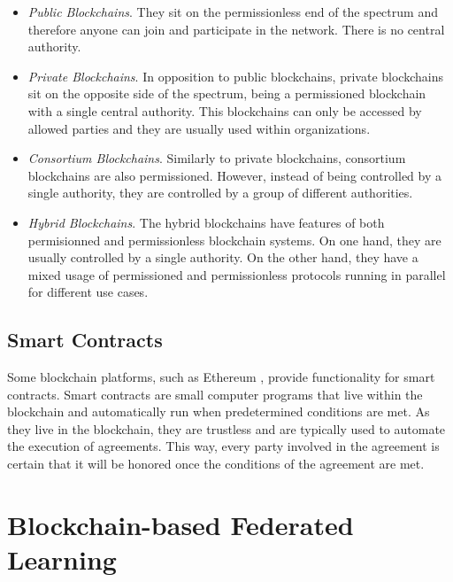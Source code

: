 \begin{itemize}
    \item \textit{Public Blockchains}. They sit on the permissionless end of the spectrum and therefore anyone can join and participate in the network. There is no central authority.

    \item \textit{Private Blockchains}. In opposition to public blockchains, private blockchains sit on the opposite side of the spectrum, being a permissioned blockchain with a single central authority. This blockchains can only be accessed by allowed parties and they are usually used within organizations.

    \item \textit{Consortium Blockchains}. Similarly to private blockchains, consortium blockchains are also permissioned. However, instead of being controlled by a single authority, they are controlled by a group of different authorities.

    \item \textit{Hybrid Blockchains}. The hybrid blockchains have features of both permisionned and permissionless blockchain systems. On one hand, they are usually controlled by a single authority. On the other hand, they have a mixed usage of permissioned and permissionless protocols running in parallel for different use cases.
\end{itemize}

\subsection{Smart Contracts}

Some blockchain platforms, such as Ethereum \cite{wood2014ethereum}, provide functionality for smart contracts. Smart contracts are small computer programs that live within the blockchain and automatically run when predetermined conditions are met. As they live in the blockchain, they are trustless and are typically used to automate the execution of agreements. This way, every party involved in the agreement is certain that it will be honored once the conditions of the agreement are met.

\section{Blockchain-based Federated Learning}\label{fundamentals:blockchain}

